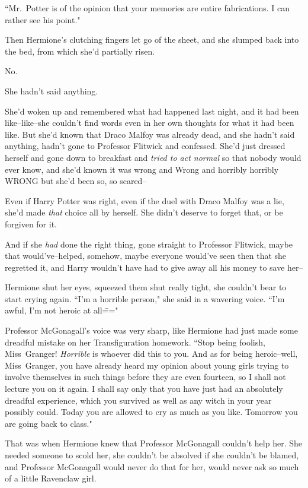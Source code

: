 ``Mr.~Potter is of the opinion that your memories are entire fabrications. I can rather see his point."

Then Hermione's clutching fingers let go of the sheet, and she slumped back into the bed, from which she'd partially risen.

No.

She hadn't said anything.

She'd woken up and remembered what had happened last night, and it had been like\---like\---she couldn't find words even in her own thoughts for what it had been like. But she'd known that Draco Malfoy was already dead, and she hadn't said anything, hadn't gone to Professor Flitwick and confessed. She'd just dressed herself and gone down to breakfast and \emph{tried to act normal} so that nobody would ever know, and she'd known it was wrong and Wrong and horribly horribly WRONG but she'd been so, so scared\---

Even if Harry Potter was right, even if the duel with Draco Malfoy was a lie, she'd made \emph{that} choice all by herself. She didn't deserve to forget that, or be forgiven for it.

And if she \emph{had} done the right thing, gone straight to Professor Flitwick, maybe that would've\---helped, somehow, maybe everyone would've seen then that she regretted it, and Harry wouldn't have had to give away all his money to save her\---

Hermione shut her eyes, squeezed them shut really tight, she couldn't bear to start crying again. ``I'm a horrible person," she said in a wavering voice. ``I'm awful, I'm not heroic at all\==="

Professor McGonagall's voice was very sharp, like Hermione had just made some dreadful mistake on her Transfiguration homework. ``Stop being foolish, Miss~Granger! \emph{Horrible} is whoever did this to you. And as for being heroic\---well, Miss~Granger, you have already heard my opinion about young girls trying to involve themselves in such things before they are even fourteen, so I shall not lecture you on it again. I shall say only that you have just had an absolutely dreadful experience, which you survived as well as any witch in your year possibly could. Today you are allowed to cry as much as you like. Tomorrow you are going back to class."

That was when Hermione knew that Professor McGonagall couldn't help her. She needed someone to scold her, she couldn't be absolved if she couldn't be blamed, and Professor McGonagall would never do that for her, would never ask so much of a little Ravenclaw girl.


